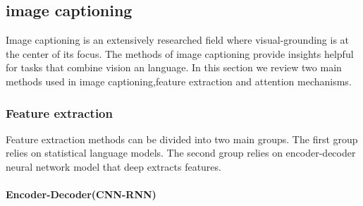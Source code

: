 





\subsection{image captioning}

Image captioning is an extensively researched field where visual-grounding is at the  center of its focus. The methods of image captioning provide insights helpful for tasks that combine vision an language. In this section we review two main methods used in image captioning,feature extraction and attention mechanisms.   


\subsubsection{Feature extraction}

Feature extraction methods can be divided into two main groups. The first group relies on statistical language models. The second group relies on encoder-decoder neural network model that deep extracts features.\cite{Imagecap}

\paragraph{Encoder-Decoder(CNN-RNN)}

